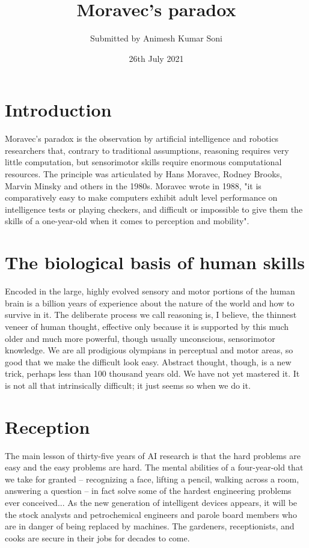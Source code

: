 \documentclass[a4paper]{article}
\title{Moravec's paradox}
\author{Submitted by Animesh Kumar Soni}
\date{26th July 2021}
\begin{document}
\maketitle

\section{Introduction}
Moravec's paradox is the observation by artificial intelligence and robotics researchers that, contrary to traditional assumptions, reasoning requires very little computation, but sensorimotor skills require enormous computational resources. The principle was articulated by Hans Moravec, Rodney Brooks, Marvin Minsky and others in the 1980s. Moravec wrote in 1988, "it is comparatively easy to make computers exhibit adult level performance on intelligence tests or playing checkers, and difficult or impossible to give them the skills of a one-year-old when it comes to perception and mobility".
\section{The biological basis of human skills }
Encoded in the large, highly evolved sensory and motor portions of the human brain is a billion years of experience about the nature of the world and how to survive in it. The deliberate process we call reasoning is, I believe, the thinnest veneer of human thought, effective only because it is supported by this much older and much more powerful, though usually unconscious, sensorimotor knowledge. We are all prodigious olympians in perceptual and motor areas, so good that we make the difficult look easy. Abstract thought, though, is a new trick, perhaps less than 100 thousand years old. We have not yet mastered it. It is not all that intrinsically difficult; it just seems so when we do it.
\section{Reception}
The main lesson of thirty-five years of AI research is that the hard problems are easy and the easy problems are hard. The mental abilities of a four-year-old that we take for granted – recognizing a face, lifting a pencil, walking across a room, answering a question – in fact solve some of the hardest engineering problems ever conceived... As the new generation of intelligent devices appears, it will be the stock analysts and petrochemical engineers and parole board members who are in danger of being replaced by machines. The gardeners, receptionists, and cooks are secure in their jobs for decades to come.
\end{document}
